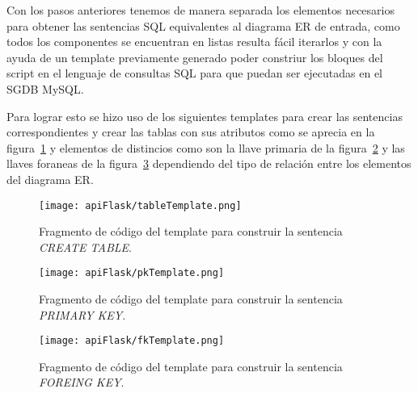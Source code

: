 Con los pasos anteriores tenemos de manera separada los elementos necesarios para obtener las sentencias SQL equivalentes al diagrama ER de entrada, como todos los componentes se encuentran en listas resulta fácil iterarlos y con la ayuda de un template previamente generado poder constriur los bloques del script en el lenguaje de consultas SQL para que puedan ser ejecutadas en el SGDB MySQL.

Para lograr esto se hizo uso de los siguientes templates para crear las sentencias correspondientes y crear las tablas con sus atributos como se aprecia en la figura~\ref{img:templateTable} y elementos de distincios como son la llave primaria de la figura~\ref{img:pkTemplate} y las llaves foraneas de la figura~\ref{img:fkTemplate} dependiendo del tipo de relación entre los elementos del diagrama ER.


\begin{figure}[H]
  \centering
  \texttt{[image: apiFlask/tableTemplate.png]}
  \caption{Fragmento de código del template para construir la sentencia \textit{CREATE TABLE}.}
  \label{img:templateTable}
\end{figure}

\begin{figure}[H]
  \centering
  \texttt{[image: apiFlask/pkTemplate.png]}
  \caption{Fragmento de código del template para construir la sentencia \textit{PRIMARY KEY}.}
  \label{img:pkTemplate}
\end{figure}

\begin{figure}[H]
  \centering
  \texttt{[image: apiFlask/fkTemplate.png]}
  \caption{Fragmento de código del template para construir la sentencia \textit{FOREING KEY}.}
  \label{img:fkTemplate}
\end{figure}